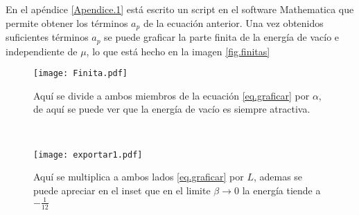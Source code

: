En el apéndice \ref{Apendice.1} está escrito un script en el software Mathematica que permite obtener los términos $a _p$ de la ecuación anterior. 
Una vez obtenidos suficientes términos $a_p$ se puede graficar la parte finita de la energía de vacío e independiente de $\mu$, lo que está hecho en la imagen \ref{fig.finitas}



\begin{figure*}[t!]
    \centering
    \begin{subfigure}[t]{0.5\textwidth}
        \centering
        \texttt{[image: Finita.pdf]}
        \caption{Aquí se divide a ambos miembros de la ecuación \ref{eq.graficar} por $				\alpha$, de aquí se puede ver que la energía de vacío es siempre atractiva.}
        \label{fig.izquierda}
    \end{subfigure}%
    ~ 
    \begin{subfigure}[t]{0.5\textwidth}
        \centering
        \texttt{[image: exportar1.pdf]}
        \caption{Aquí se multiplica a ambos lados \ref{eq.graficar} por $L$, ademas 				se puede apreciar en el inset que en el limite $\beta \rightarrow 0$ la energía 		tiende a $- \frac{1}{12}$}
        \label{fig.derecha}
    \end{subfigure}
    \caption{En esta imagen se muestran dos posibles adimensionalizaciones de la ecuación \ref{eq.graficar}, que representan la energía de vacío independiente de $\mu$ .}
\label{fig.finitas}
\end{figure*}

